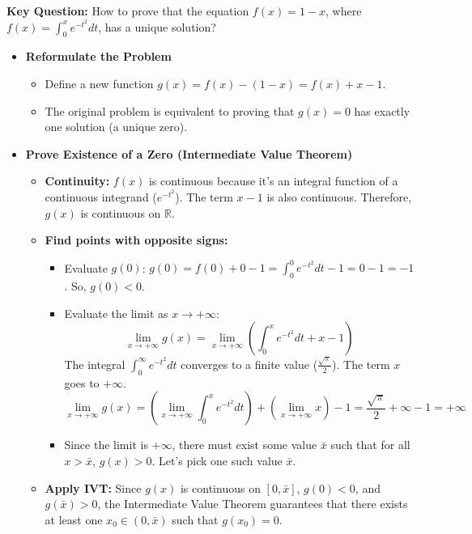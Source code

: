 \begin{cascade}
	\textbf{Key Question:} How to prove that the equation $f(x) = 1-x$, where $f(x) = \int_0^x e^{-t^2} dt$, has a unique solution?
	\begin{itemize}
		\item \textbf{Reformulate the Problem}
		      \begin{itemize}
			      \item Define a new function $g(x) = f(x) - (1-x) = f(x) + x - 1$.
			      \item The original problem is equivalent to proving that $g(x) = 0$ has exactly one solution (a unique zero).
		      \end{itemize}
		\item \textbf{Prove Existence of a Zero (Intermediate Value Theorem)}
		      \begin{itemize}
			      \item \textbf{Continuity:} $f(x)$ is continuous because it's an integral function of a continuous integrand ($e^{-t^2}$). The term $x-1$ is also continuous. Therefore, $g(x)$ is continuous on $\mathbb{R}$.
			      \item \textbf{Find points with opposite signs:}
			            \begin{itemize}
				            \item Evaluate $g(0)$: $g(0) = f(0) + 0 - 1 = \int_0^0 e^{-t^2} dt - 1 = 0 - 1 = -1$. So, $g(0) < 0$.
				            \item Evaluate the limit as $x \to +\infty$:
				                  \[ \lim_{x\to+\infty} g(x) = \lim_{x\to+\infty} \left( \int_0^x e^{-t^2} dt + x - 1 \right) \]
				                  The integral $\int_0^\infty e^{-t^2} dt$ converges to a finite value ($\frac{\sqrt{\pi}}{2}$). The term $x$ goes to $+\infty$.
				                  \[ \lim_{x\to+\infty} g(x) = \left( \lim_{x\to+\infty} \int_0^x e^{-t^2} dt \right) + \left( \lim_{x\to+\infty} x \right) - 1 = \frac{\sqrt{\pi}}{2} + \infty - 1 = +\infty \]
				            \item Since the limit is $+\infty$, there must exist some value $\bar{x}$ such that for all $x > \bar{x}$, $g(x) > 0$. Let's pick one such value $\bar{x}$.
			            \end{itemize}
			      \item \textbf{Apply IVT:} Since $g(x)$ is continuous on $[0, \bar{x}]$, $g(0) < 0$, and $g(\bar{x}) > 0$, the Intermediate Value Theorem guarantees that there exists at least one $x_0 \in (0, \bar{x})$ such that $g(x_0) = 0$.

\end{itemize}
\end{itemize}
\end{cascade}
